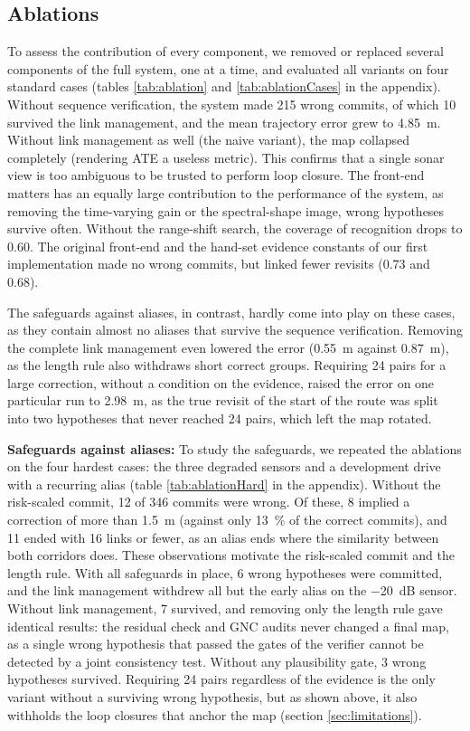 \subsection{Ablations}
\label{sec:resultsAblation}
To assess the contribution of every component, we removed or replaced several components of the full system, one at a time, and evaluated all variants on four standard cases (tables \ref{tab:ablation} and \ref{tab:ablationCases} in the appendix). Without sequence verification, the system made 215 wrong commits, of which 10 survived the link management, and the mean trajectory error grew to \SI{4.85}{\meter}. Without link management as well (the naive variant), the map collapsed completely (rendering ATE a useless metric). This confirms that a single sonar view is too ambiguous to be trusted to perform loop closure. The front-end matters has an equally large contribution to the performance of the system, as removing the time-varying gain or the spectral-shape image, wrong hypotheses survive often. Without the range-shift search, the coverage of recognition drops to 0.60. The original front-end and the hand-set evidence constants of our first implementation made no wrong commits, but linked fewer revisits (0.73 and 0.68).

The safeguards against aliases, in contrast, hardly come into play on these cases, as they contain almost no aliases that survive the sequence verification. Removing the complete link management even lowered the error (\SI{0.55}{\meter} against \SI{0.87}{\meter}), as the length rule also withdraws short correct groups. Requiring 24 pairs for a large correction, without a condition on the evidence, raised the error on one particular run to \SI{2.98}{\meter}, as the true revisit of the start of the route was split into two hypotheses that never reached 24 pairs, which left the map rotated.

\textbf{Safeguards against aliases:} To study the safeguards, we repeated the ablations on the four hardest cases: the three degraded sensors and a development drive with a recurring alias (table \ref{tab:ablationHard} in the appendix). Without the risk-scaled commit, 12 of 346 commits were wrong. Of these, 8 implied a correction of more than \SI{1.5}{\meter} (against only \SI{13}{\percent} of the correct commits), and 11 ended with 16 links or fewer, as an alias ends where the similarity between both corridors does. These observations motivate the risk-scaled commit and the length rule. With all safeguards in place, 6 wrong hypotheses were committed, and the link management withdrew all but the early alias on the \SI{-20}{\deci\bel} sensor. Without link management, 7 survived, and removing only the length rule gave identical results: the residual check and GNC audits never changed a final map, as a single wrong hypothesis that passed the gates of the verifier cannot be detected by a joint consistency test. Without any plausibility gate, 3 wrong hypotheses survived. Requiring 24 pairs regardless of the evidence is the only variant without a surviving wrong hypothesis, but as shown above, it also withholds the loop closures that anchor the map (section \ref{sec:limitations}).


